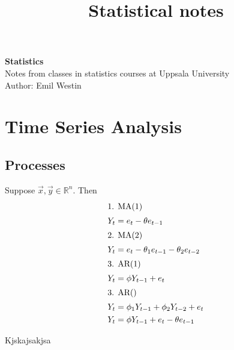 \documentclass[11pt]{article}
\begin{document}
\title{Statistical notes}

\thispagestyle{empty}

\begin{center}
{\LARGE \bf Statistics}\\
Notes from classes in statistics courses at Uppsala University \\
Author: Emil Westin
\end{center}

\section{Time Series Analysis}
\subsection{Processes}

Suppose $\vec{x},\vec{y} \in \mathbb{R}^n$. Then 
\begin{align}
\intertext{1. MA(1)}
Y_t & = e_t - \theta e_{t-1} \label{MA1} \\
\intertext{2. MA(2)}
Y_t & = e_t - \theta_1 e_{t-1} -  \theta_2 e_{t-2} \label{MA2} \\
\intertext{3. AR(1)}
Y_t & = \phi Y_{t-1} + e_t \label{AR1} \\
\intertext{3. AR()}
Y_t & = \phi_1 Y_{t-1} + \phi_2 Y_{t-2} + e_t \label{AR2} \\
Y_t & = \phi Y_{t-1} + e_t - \theta e_{t-1} \label{ARMA} 
\end{align}

Kjskajsakjsa
\end{document}
